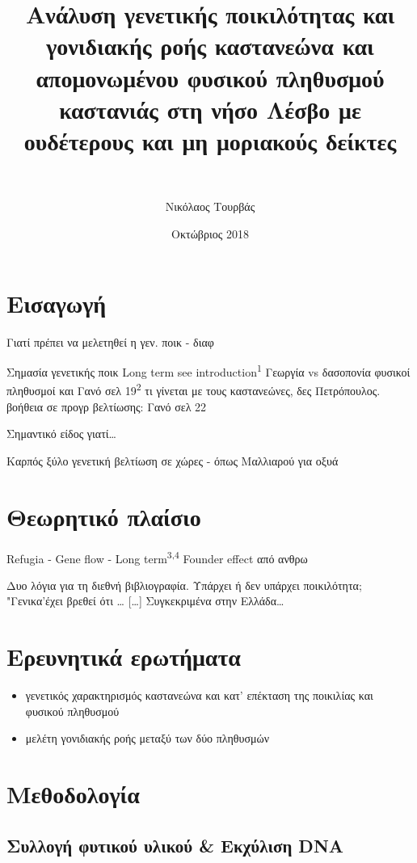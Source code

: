 \documentclass[12pt,a4paper,]{report}
\title{Ανάλυση γενετικής ποικιλότητας και γονιδιακής ροής καστανεώνα και
απομονωμένου φυσικού πληθυσμού καστανιάς στη νήσο Λέσβο με ουδέτερους
και μη μοριακούς δείκτες}
\subtitle{~}
\author{Νικόλαος Τουρβάς}
\date{Οκτώβριος 2018}
\providecommand{\tightlist}{%
  \setlength{\itemsep}{0pt}\setlength{\parskip}{0pt}}
\begin{document}
\maketitle

\section{Εισαγωγή}

Γιατί πρέπει να μελετηθεί η γεν. ποικ - διαφ

Σημασία γενετικής ποικ Long term see introduction\textsuperscript{1}
Γεωργία vs δασοπονία φυσικοί πληθυσμοί και Γανό σελ
19\textsuperscript{2} τι γίνεται με τους καστανεώνες, δες Πετρόπουλος.
βοήθεια σε προγρ βελτίωσης: Γανό σελ 22

Σημαντικό είδος γιατί\ldots{}

Καρπός ξύλο γενετική βελτίωση σε χώρες - όπως Μαλλιαρού για οξυά

\hypertarget{-}{%
\section{Θεωρητικό πλαίσιο}\label{-}}

Refugia - Gene flow - Long term\textsuperscript{3,4} Founder effect από
ανθρω

Δυο λόγια για τη διεθνή βιβλιογραφία. Υπάρχει ή δεν υπάρχει ποικιλότητα;
"Γενικα'έχει βρεθεί ότι \ldots{} {[}\ldots{}{]} Συγκεκριμένα στην
Ελλάδα\ldots{}

\hypertarget{-}{%
\section{Ερευνητικά ερωτήματα}\label{-}}

\begin{itemize}
\tightlist
\item
  γενετικός χαρακτηρισμός καστανεώνα και κατ' επέκταση της ποικιλίας και
  φυσικού πληθυσμού
\item
  μελέτη γονιδιακής ροής μεταξύ των δύο πληθυσμών
\end{itemize}

\section{Μεθοδολογία}

\hypertarget{----dna}{%
\subsection{Συλλογή φυτικού υλικού \& Εκχύλιση DNA}\label{----dna}}
\end{document}
